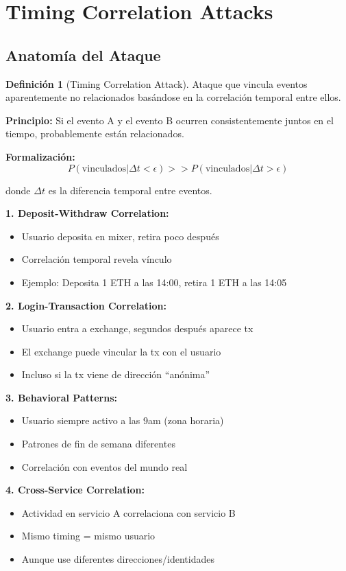 \documentclass[11pt,a4paper,twoside]{book}
\theoremstyle{definition}
\newtheorem{definition}{Definición}[chapter]
\theoremstyle{remark}
\begin{document}
\section{Timing Correlation Attacks}
\label{sec:timing-correlation}

\subsection{Anatomía del Ataque}

\begin{definition}[Timing Correlation Attack]
Ataque que vincula eventos aparentemente no relacionados basándose en la correlación temporal entre ellos.

\textbf{Principio:} Si el evento A y el evento B ocurren consistentemente juntos en el tiempo, probablemente están relacionados.

\textbf{Formalización:}
\[
P(\text{vinculados} | \Delta t < \epsilon) >> P(\text{vinculados} | \Delta t > \epsilon)
\]

donde $\Delta t$ es la diferencia temporal entre eventos.
\end{definition}

\begin{mathnote}
\textbf{1. Deposit-Withdraw Correlation:}
\begin{itemize}
    \item Usuario deposita en mixer, retira poco después
    \item Correlación temporal revela vínculo
    \item Ejemplo: Deposita 1 ETH a las 14:00, retira 1 ETH a las 14:05
\end{itemize}

\textbf{2. Login-Transaction Correlation:}
\begin{itemize}
    \item Usuario entra a exchange, segundos después aparece tx
    \item El exchange puede vincular la tx con el usuario
    \item Incluso si la tx viene de dirección ``anónima''
\end{itemize}

\textbf{3. Behavioral Patterns:}
\begin{itemize}
    \item Usuario siempre activo a las 9am (zona horaria)
    \item Patrones de fin de semana diferentes
    \item Correlación con eventos del mundo real
\end{itemize}

\textbf{4. Cross-Service Correlation:}
\begin{itemize}
    \item Actividad en servicio A correlaciona con servicio B
    \item Mismo timing = mismo usuario
    \item Aunque use diferentes direcciones/identidades
\end{itemize}
\end{mathnote}
\end{document}
